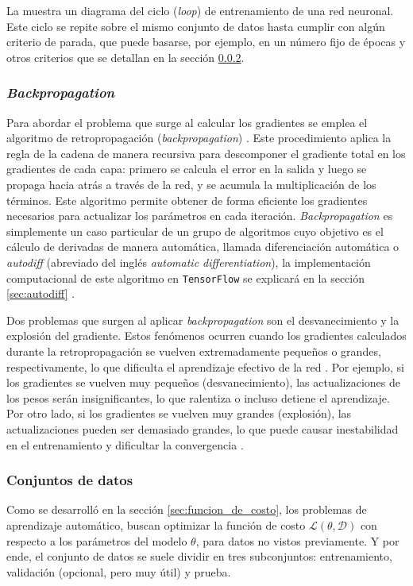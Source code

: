 La  muestra un diagrama del ciclo (\textit{loop}) de entrenamiento de una red neuronal. Este ciclo se repite sobre el mismo conjunto de datos hasta cumplir con algún criterio de parada, que puede basarse, por ejemplo, en un número fijo de épocas y otros criterios que se detallan en la sección \ref{sec:conjuntos_de_datos}.



\subsubsection{\textit{Backpropagation}}
Para abordar el problema que surge al calcular los gradientes se emplea el algoritmo de retropropagación (\textit{backpropagation}) \cite{rumelhart1986learning}. Este procedimiento aplica la regla de la cadena de manera recursiva para descomponer el gradiente total en los gradientes de cada capa: primero se calcula el error en la salida y luego se propaga hacia atrás a través de la red, y se acumula la multiplicación de los términos. Este algoritmo permite obtener de forma eficiente los gradientes necesarios para actualizar los parámetros en cada iteración. \textit{Backpropagation} es simplemente un caso particular de un grupo de algoritmos cuyo objetivo es el cálculo de derivadas de manera automática, llamada diferenciación automática o \textit{autodiff} (abreviado del inglés \textit{automatic differentiation}), la implementación computacional de este algoritmo en \texttt{TensorFlow} se explicará en la sección \ref{sec:autodiff} \cite{Goodfellow2016}.

Dos problemas que surgen al aplicar \textit{backpropagation} son el desvanecimiento y la explosión del gradiente. Estos fenómenos ocurren cuando los gradientes calculados durante la retropropagación se vuelven extremadamente pequeños o grandes, respectivamente, lo que dificulta el aprendizaje efectivo de la red \cite{Goodfellow2016}. Por ejemplo, si los gradientes se vuelven muy pequeños (desvanecimiento), las actualizaciones de los pesos serán insignificantes, lo que ralentiza o incluso detiene el aprendizaje. Por otro lado, si los gradientes se vuelven muy grandes (explosión), las actualizaciones pueden ser demasiado grandes, lo que puede causar inestabilidad en el entrenamiento y dificultar la convergencia \cite{Goodfellow2016}.

\subsubsection{Conjuntos de datos}
\label{sec:conjuntos_de_datos}
Como se desarrolló en la sección \ref{sec:funcion_de_costo}, los problemas de aprendizaje automático, buscan optimizar la función de costo $\mathcal{L}(\theta, \mathcal{D})$ con respecto a los parámetros del modelo $\theta$, para datos no vistos previamente. Y por ende, el conjunto de datos se suele dividir en tres subconjuntos: entrenamiento, validación (opcional, pero muy útil) y prueba.

